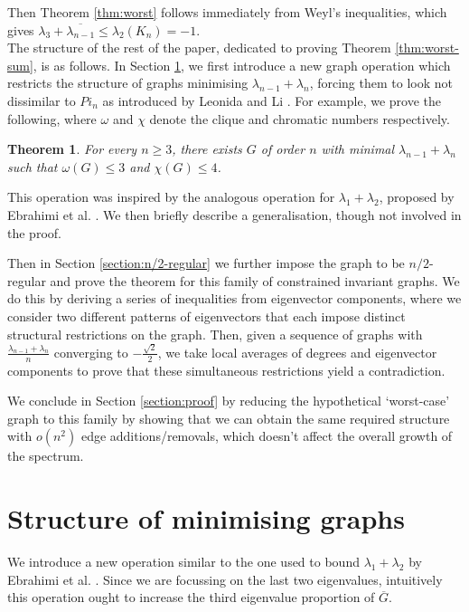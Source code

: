 \documentclass[11pt]{article}
\newtheorem{thm}{Theorem}[section]
\begin{document}
Then Theorem \ref{thm:worst} follows immediately from Weyl's inequalities, which gives $\lambda_3 + \overline{\lambda_{n-1}} \le \lambda_2(K_n) = -1$. \\

The structure of the rest of the paper, dedicated to proving Theorem \ref{thm:worst-sum}, is as follows. In Section \ref{section:structure}, we first introduce a new graph operation which restricts the structure of graphs minimising $\lambda_{n-1} + \lambda_n$, forcing them to look not dissimilar to $Pi_n$ as introduced by Leonida and Li \cite{leonida2024structure}. For example, we prove the following, where $\omega$ and $\chi$ denote the clique and chromatic numbers respectively. 

\begin{thm}\label{thm:worst-structure-intro}
    For every $n \ge 3$, there exists $G$ of order $n$ with minimal $\lambda_{n-1} + \lambda_n$ such that $\omega(G) \le 3$ and $\chi(G) \le 4$. 
\end{thm}

This operation was inspired by the analogous operation for $\lambda_1 + \lambda_2$, proposed by Ebrahimi et al. \cite{ebrahimi2008tau2}. We then briefly describe a generalisation, though not involved in the proof. 

Then in Section \ref{section:n/2-regular} we further impose the graph to be $n/2$-regular and prove the theorem for this family of constrained invariant graphs. We do this by deriving a series of inequalities from eigenvector components, where we consider two different patterns of eigenvectors that each impose distinct structural restrictions on the graph. Then, given a sequence of graphs with $\frac{\lambda_{n-1} + \lambda_n}{n}$ converging to $-\frac{\sqrt{2}}{2}$, we take local averages of degrees and eigenvector components to prove that these simultaneous restrictions yield a contradiction.

We conclude in Section \ref{section:proof} by reducing the hypothetical `worst-case' graph to this family by showing that we can obtain the same required structure with $o(n^2)$ edge additions/removals, which doesn't affect the overall growth of the spectrum.

\section{Structure of minimising graphs}\label{section:structure}

We introduce a new operation similar to the one used to bound $\lambda_1 + \lambda_2$ by Ebrahimi et al. \cite{ebrahimi2008tau2}. Since we are focussing on the last two eigenvalues, intuitively this operation ought to increase the third eigenvalue proportion of $\overline{G}$. 
\end{document}
